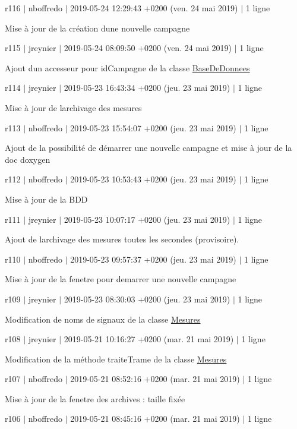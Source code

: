 r116 $\vert$ nboffredo $\vert$ 2019-\/05-\/24 12\+:29\+:43 +0200 (ven. 24 mai 2019) $\vert$ 1 ligne

Mise à jour de la création d\textquotesingle{}une nouvelle campagne

r115 $\vert$ jreynier $\vert$ 2019-\/05-\/24 08\+:09\+:50 +0200 (ven. 24 mai 2019) $\vert$ 1 ligne

Ajout d\textquotesingle{}un accesseur pour id\+Campagne de la classe \hyperlink{class_base_de_donnees}{Base\+De\+Donnees}

r114 $\vert$ jreynier $\vert$ 2019-\/05-\/23 16\+:43\+:34 +0200 (jeu. 23 mai 2019) $\vert$ 1 ligne

Mise à jour de l\textquotesingle{}archivage des mesures

r113 $\vert$ nboffredo $\vert$ 2019-\/05-\/23 15\+:54\+:07 +0200 (jeu. 23 mai 2019) $\vert$ 1 ligne

Ajout de la possibilité de démarrer une nouvelle campagne et mise à jour de la doc doxygen

r112 $\vert$ nboffredo $\vert$ 2019-\/05-\/23 10\+:53\+:43 +0200 (jeu. 23 mai 2019) $\vert$ 1 ligne

Mise à jour de la B\+DD

r111 $\vert$ jreynier $\vert$ 2019-\/05-\/23 10\+:07\+:17 +0200 (jeu. 23 mai 2019) $\vert$ 1 ligne

Ajout de l\textquotesingle{}archivage des mesures toutes les secondes (provisoire).

r110 $\vert$ nboffredo $\vert$ 2019-\/05-\/23 09\+:57\+:37 +0200 (jeu. 23 mai 2019) $\vert$ 1 ligne

Mise à jour de la fenetre pour demarrer une nouvelle campagne

r109 $\vert$ jreynier $\vert$ 2019-\/05-\/23 08\+:30\+:03 +0200 (jeu. 23 mai 2019) $\vert$ 1 ligne

Modification de noms de signaux de la classe \hyperlink{class_mesures}{Mesures}

r108 $\vert$ jreynier $\vert$ 2019-\/05-\/21 10\+:16\+:27 +0200 (mar. 21 mai 2019) $\vert$ 1 ligne

Modification de la méthode traite\+Trame de la classe \hyperlink{class_mesures}{Mesures}

r107 $\vert$ nboffredo $\vert$ 2019-\/05-\/21 08\+:52\+:16 +0200 (mar. 21 mai 2019) $\vert$ 1 ligne

Mise à jour de la fenetre des archives \+: taille fixée

r106 $\vert$ nboffredo $\vert$ 2019-\/05-\/21 08\+:45\+:16 +0200 (mar. 21 mai 2019) $\vert$ 1 ligne

